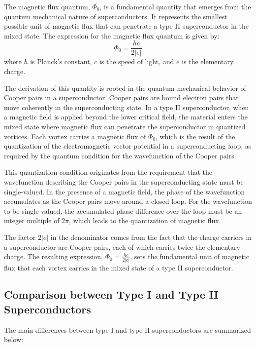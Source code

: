 \documentclass{article}
\begin{document}
\begin{theorem}
    The magnetic flux quantum, \(\Phi_0\), is a fundamental quantity that emerges from the quantum mechanical nature of superconductors. It represents the smallest possible unit of magnetic flux that can penetrate a type II superconductor in the mixed state. The expression for the magnetic flux quantum is given by:
\[
\Phi_0 = \frac{hc}{2|e|}
\]
where \(h\) is Planck's constant, \(c\) is the speed of light, and \(e\) is the elementary charge.

The derivation of this quantity is rooted in the quantum mechanical behavior of Cooper pairs in a superconductor. Cooper pairs are bound electron pairs that move coherently in the superconducting state. In a type II superconductor, when a magnetic field is applied beyond the lower critical field, the material enters the mixed state where magnetic flux can penetrate the superconductor in quantized vortices. Each vortex carries a magnetic flux of \(\Phi_0\), which is the result of the quantization of the electromagnetic vector potential in a superconducting loop, as required by the quantum condition for the wavefunction of the Cooper pairs.

This quantization condition originates from the requirement that the wavefunction describing the Cooper pairs in the superconducting state must be single-valued. In the presence of a magnetic field, the phase of the wavefunction accumulates as the Cooper pairs move around a closed loop. For the wavefunction to be single-valued, the accumulated phase difference over the loop must be an integer multiple of \(2\pi\), which leads to the quantization of magnetic flux.

The factor \(2|e|\) in the denominator comes from the fact that the charge carriers in a superconductor are Cooper pairs, each of which carries twice the elementary charge. The resulting expression, \(\Phi_0 = \frac{hc}{2|e|}\), sets the fundamental unit of magnetic flux that each vortex carries in the mixed state of a type II superconductor. \end{theorem}

\subsection{Comparison between Type I and Type II Superconductors}

The main differences between type I and type II superconductors are summarized below:
\end{document}
